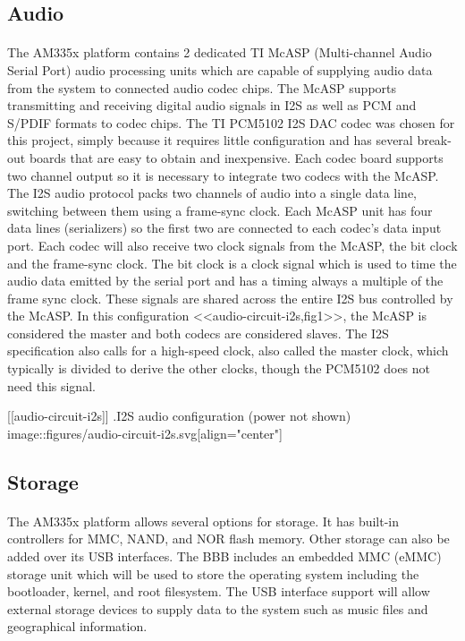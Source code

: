 \subsection{Audio}

\paragraph{}
The AM335x platform contains 2 dedicated TI McASP (Multi-channel Audio Serial Port) audio processing units which are capable of supplying audio data from the system to connected audio codec chips.
The McASP supports transmitting and receiving digital audio signals in I2S as well as PCM and S/PDIF formats to codec chips.
The TI PCM5102 I2S DAC codec was chosen for this project, simply because it requires little configuration and has several break-out boards that are easy to obtain and inexpensive.
Each codec board supports two channel output so it is necessary to integrate two codecs with the McASP.
The I2S audio protocol packs two channels of audio into a single data line, switching between them using a frame-sync clock.
Each McASP unit has four data lines (serializers) so the first two are connected to each codec's data input port.
Each codec will also receive two clock signals from the McASP, the bit clock and the frame-sync clock.
The bit clock is a clock signal which is used to time the audio data emitted by the serial port and has a timing always a multiple of the frame sync clock.
These signals are shared across the entire I2S bus controlled by the McASP.
In this configuration <<audio-circuit-i2s,fig1>>, the McASP is considered the master and both codecs are considered slaves.
The I2S specification also calls for a high-speed clock, also called the master clock, which typically is divided to derive the other clocks, though the PCM5102 does not need this signal.

[[audio-circuit-i2s]]
.I2S audio configuration (power not shown)
image::figures/audio-circuit-i2s.svg[align="center"]

\subsection{Storage}

\paragraph{}
The AM335x platform allows several options for storage.
It has built-in controllers for MMC, NAND, and NOR flash memory.
Other storage can also be added over its USB interfaces.
The BBB includes an embedded MMC (eMMC) storage unit which will be used to store the operating system including the bootloader, kernel, and root filesystem.
The USB interface support will allow external storage devices to supply data to the system such as music files and geographical information.

